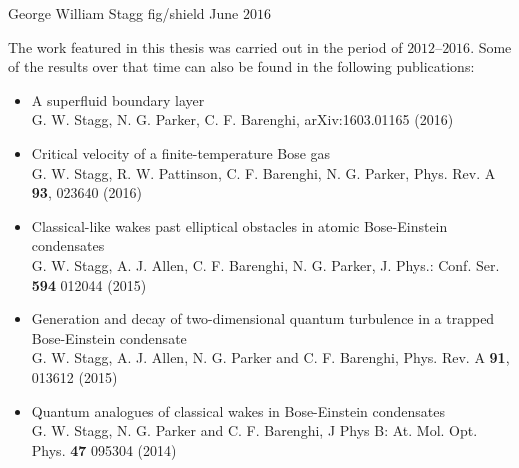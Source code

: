 \documentclass[11pt]{report}
\begin{document}
           {George William Stagg}       %
           {fig/shield}                 %
           {June $2016$}                %

  \thispagestyle{empty}
  \cleardoublepage
  \newpage
  \thispagestyle{empty}
  \noindent The work featured in this thesis was carried out in the period of $2012$--$2016$. Some of the results over that time can also be found in the following publications:
  \begin{itemize}
  \item A superfluid boundary layer\\
  {\footnotesize G. W. Stagg, N. G. Parker, C. F. Barenghi, arXiv:1603.01165 (2016)}
  \item Critical velocity of a finite-temperature Bose gas\\
  {\footnotesize G. W. Stagg, R. W. Pattinson, C. F. Barenghi, N. G. Parker, Phys. Rev. A {\bf 93}, 023640 (2016)}
  \item Classical-like wakes past elliptical obstacles in atomic Bose-Einstein condensates\\
  {\footnotesize G. W. Stagg, A. J. Allen, C. F. Barenghi, N. G. Parker, J. Phys.: Conf. Ser. {\bf 594} 012044 (2015)}
  \item Generation and decay of two-dimensional quantum turbulence in a trapped Bose-Einstein condensate\\
  {\footnotesize G. W. Stagg, A. J. Allen, N. G. Parker and C. F. Barenghi, Phys. Rev. A {\bf 91}, 013612 (2015)}
  \item Quantum analogues of classical wakes in Bose-Einstein condensates\\
  {\footnotesize G. W. Stagg, N. G. Parker and C. F. Barenghi, J Phys B: At. Mol. Opt. Phys. {\bf 47} 095304 (2014)}
  \end{itemize}
  \newpage
  \clearpage
  \thispagestyle{empty}
  \cleardoublepage
  \tableofcontents



  \clearpage                            %
  \thispagestyle{empty}                 %
  \cleardoublepage                      %
\end{document}
